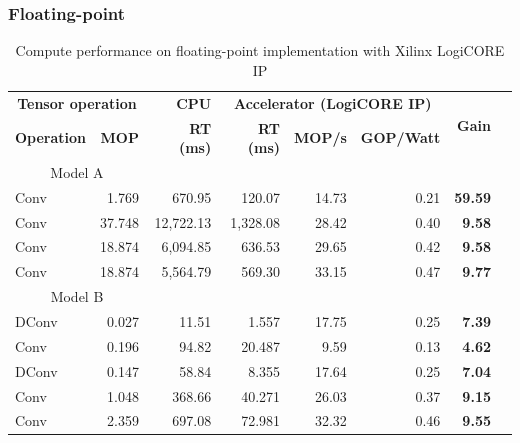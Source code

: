 \subsubsection{Floating-point}
\begin{table}[!htp]\centering
	\caption{Compute performance on floating-point implementation with Xilinx LogiCORE IP}\label{tab:performace_float_logicore }
	\scriptsize
	\begin{tabular}{lrrrrrrr}\toprule
		\multicolumn{2}{c}{\textbf{Tensor operation}} &\textbf{CPU} &\multicolumn{3}{c}{\textbf{Accelerator (LogiCORE IP)}} &\multirow{2}{*}{\textbf{Gain}} \\\cmidrule{1-6}
		\textbf{Operation} &\textbf{MOP} &\textbf{RT (ms)} &\textbf{RT (ms)} &\textbf{MOP/s} &\textbf{GOP/Watt} & \\\midrule
		\multicolumn{2}{c}{Model A} & & & & & \\
		Conv &1.769 &670.95 &120.07 &14.73 &0.21 &\textbf{59.59} \\
		Conv &37.748 &12,722.13 &1,328.08 &28.42 &0.40 &\textbf{9.58} \\
		Conv &18.874 &6,094.85 &636.53 &29.65 &0.42 &\textbf{9.58} \\
		Conv &18.874 &5,564.79 &569.30 &33.15 &0.47 &\textbf{9.77} \\
		\multicolumn{2}{c}{Model B} & & & & & \\
		DConv &0.027 &11.51 &1.557 &17.75 &0.25 &\textbf{7.39} \\
		Conv &0.196 &94.82 &20.487 &9.59 &0.13 &\textbf{4.62} \\
		DConv &0.147 &58.84 &8.355 &17.64 &0.25 &\textbf{7.04} \\
		Conv &1.048 &368.66 &40.271 &26.03 &0.37 &\textbf{9.15} \\
		Conv &2.359 &697.08 &72.981 &32.32 &0.46 &\textbf{9.55} \\
		\bottomrule
	\end{tabular}
\end{table}

